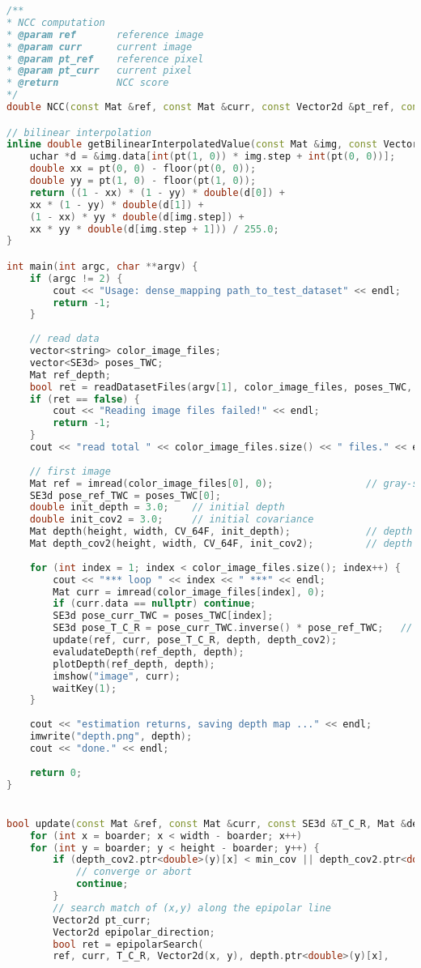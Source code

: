 \begin{lstlisting}[language=c++,caption=slambook2/ch12/dense\_monocular/dense\_mapping.cpp (part)]
/**
* NCC computation
* @param ref       reference image
* @param curr      current image 
* @param pt_ref    reference pixel 
* @param pt_curr   current pixel 
* @return          NCC score
*/
double NCC(const Mat &ref, const Mat &curr, const Vector2d &pt_ref, const Vector2d &pt_curr);

// bilinear interpolation
inline double getBilinearInterpolatedValue(const Mat &img, const Vector2d &pt) {
	uchar *d = &img.data[int(pt(1, 0)) * img.step + int(pt(0, 0))];
	double xx = pt(0, 0) - floor(pt(0, 0));
	double yy = pt(1, 0) - floor(pt(1, 0));
	return ((1 - xx) * (1 - yy) * double(d[0]) +
	xx * (1 - yy) * double(d[1]) +
	(1 - xx) * yy * double(d[img.step]) +
	xx * yy * double(d[img.step + 1])) / 255.0;
}

int main(int argc, char **argv) {
	if (argc != 2) {
		cout << "Usage: dense_mapping path_to_test_dataset" << endl;
		return -1;
	}
	
	// read data
	vector<string> color_image_files;
	vector<SE3d> poses_TWC;
	Mat ref_depth;
	bool ret = readDatasetFiles(argv[1], color_image_files, poses_TWC, ref_depth);
	if (ret == false) {
		cout << "Reading image files failed!" << endl;
		return -1;
	}
	cout << "read total " << color_image_files.size() << " files." << endl;
	
	// first image
	Mat ref = imread(color_image_files[0], 0);                // gray-scale image
	SE3d pose_ref_TWC = poses_TWC[0];
	double init_depth = 3.0;    // initial depth 
	double init_cov2 = 3.0;     // initial covariance 
	Mat depth(height, width, CV_64F, init_depth);             // depth image
	Mat depth_cov2(height, width, CV_64F, init_cov2);         // depth cov image
	
	for (int index = 1; index < color_image_files.size(); index++) {
		cout << "*** loop " << index << " ***" << endl;
		Mat curr = imread(color_image_files[index], 0);
		if (curr.data == nullptr) continue;
		SE3d pose_curr_TWC = poses_TWC[index];
		SE3d pose_T_C_R = pose_curr_TWC.inverse() * pose_ref_TWC;   // T_C_W * T_W_R = T_C_R
		update(ref, curr, pose_T_C_R, depth, depth_cov2);
		evaludateDepth(ref_depth, depth);
		plotDepth(ref_depth, depth);
		imshow("image", curr);
		waitKey(1);
	}
	
	cout << "estimation returns, saving depth map ..." << endl;
	imwrite("depth.png", depth);
	cout << "done." << endl;
	
	return 0;
}


bool update(const Mat &ref, const Mat &curr, const SE3d &T_C_R, Mat &depth, Mat &depth_cov2) {
	for (int x = boarder; x < width - boarder; x++)
	for (int y = boarder; y < height - boarder; y++) {
		if (depth_cov2.ptr<double>(y)[x] < min_cov || depth_cov2.ptr<double>(y)[x] > max_cov) {
			// converge or abort
			continue;
		}
		// search match of (x,y) along the epipolar line
		Vector2d pt_curr;
		Vector2d epipolar_direction;
		bool ret = epipolarSearch(
		ref, curr, T_C_R, Vector2d(x, y), depth.ptr<double>(y)[x],           sqrt(depth_cov2.ptr<double>(y)[x]), pt_curr, epipolar_direction);
		

\end{lstlisting}

